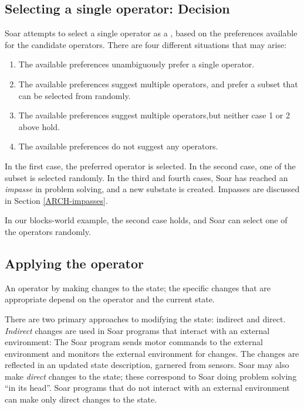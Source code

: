 \subsection{Selecting a single operator: Decision}

Soar attempts to select a single operator as a , based on the preferences available for the candidate operators. There are four different situations that may arise:

\vspace{-8pt}
\begin{enumerate}
	\item The available preferences unambiguously prefer a single operator.
	\vspace{-6pt}
	\item The available preferences suggest multiple operators, and prefer a subset that can be selected from randomly.
	\vspace{-6pt}
	\item The available preferences suggest multiple operators,but neither case 1 or 2 above hold.
	\vspace{-6pt}
	\item The available preferences do not suggest any operators.
\end{enumerate}

In the first case, the preferred operator is selected.  In the second case, one of the subset is selected randomly. In the third and fourth cases, Soar has reached an \emph{impasse} in problem solving, and a new substate is created.  Impasses are discussed in Section \ref{ARCH-impasses}.

In our blocks-world example, the second case holds, and Soar can select one of the operators randomly.

\subsection{Applying the operator}

An operator  by making changes to the state; the specific changes that are appropriate depend on the operator and the current state.

There are two primary approaches to modifying the state: indirect and direct. \emph{Indirect} changes are used in Soar programs that interact with an external environment: The Soar program sends motor commands to the external environment and monitors the external environment for changes. The changes are reflected in an updated state description, garnered from sensors. Soar may also make \emph{direct} changes to the state; these correspond to Soar doing problem solving ``in its head''. Soar programs that do not interact with an external environment can make only direct changes to the state.

